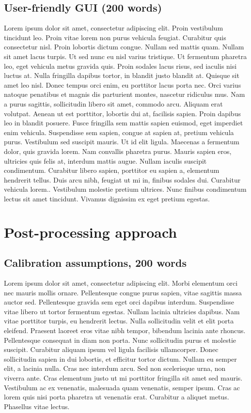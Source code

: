 \documentclass[techmemo]{ecmwfrep}%
\begin{document}
\subsection{User-friendly GUI (200 words)}
Lorem ipsum dolor sit amet, consectetur adipiscing elit. Proin vestibulum tincidunt leo. Proin vitae lorem non purus vehicula feugiat. Curabitur quis consectetur nisl. Proin lobortis dictum congue. Nullam sed mattis quam. Nullam sit amet lacus turpis. Ut sed nunc eu nisl varius tristique. Ut fermentum pharetra leo, eget vehicula metus gravida quis. Proin sodales lacus risus, sed iaculis nisi luctus at. Nulla fringilla dapibus tortor, in blandit justo blandit at. Quisque sit amet leo nisl. Donec tempus orci enim, eu porttitor lacus porta nec. Orci varius natoque penatibus et magnis dis parturient montes, nascetur ridiculus mus. Nam a purus sagittis, sollicitudin libero sit amet, commodo arcu. Aliquam erat volutpat. Aenean ut est porttitor, lobortis dui at, facilisis sapien. Proin dapibus leo in blandit posuere. Fusce fringilla sem mattis sapien euismod, eget imperdiet enim vehicula. Suspendisse sem sapien, congue at sapien at, pretium vehicula purus. Vestibulum sed suscipit mauris. Ut id elit ligula. Maecenas a fermentum dolor, quis gravida lorem. Nam convallis pharetra purus. Mauris sapien eros, ultricies quis felis at, interdum mattis augue. Nullam iaculis suscipit condimentum. Curabitur libero sapien, porttitor eu sapien a, elementum hendrerit tellus. Duis arcu nibh, feugiat ut mi in, finibus sodales dui. Curabitur vehicula lorem.. Vestibulum molestie pretium ultrices. Nunc finibus condimentum lectus sit amet tincidunt. Vivamus dignissim ex eget pretium egestas.

\section{Post-processing approach}

\subsection{Calibration assumptions, 200 words}
Lorem ipsum dolor sit amet, consectetur adipiscing elit. Morbi elementum orci nec mauris mollis ornare. Pellentesque congue purus sapien, vitae sagittis massa auctor sed. Pellentesque gravida sem eget orci dapibus interdum. Suspendisse vitae libero ut tortor fermentum egestas. Nullam lacinia ultricies dapibus. Nam vitae porttitor turpis, eu hendrerit lectus. Nulla sollicitudin velit et elit porta eleifend. Praesent laoreet eros vitae nibh tempor, bibendum lacinia ante rhoncus. Pellentesque consequat in diam non porta. Nunc sollicitudin purus et molestie suscipit. Curabitur aliquam ipsum vel ligula facilisis ullamcorper. Donec sollicitudin sapien in dui lobortis, et efficitur tortor dictum. Nullam eu semper elit, a lacinia nulla. Cras nec interdum arcu. Sed non scelerisque urna, non viverra ante. Cras elementum justo ut mi porttitor fringilla sit amet sed mauris. Vestibulum ac ex venenatis, malesuada quam venenatis, semper ipsum. Cras ac lorem quis nisi porta pharetra ut venenatis erat. Curabitur a aliquet metus. Phasellus vitae lectus.
\end{document}
